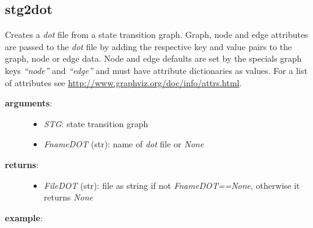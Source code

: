 \documentclass[letterpaper,10pt,english]{sphinxmanual}
\begin{document}
\subsection{stg2dot}
\label{StateTransitionGraphs:stg2dot}\label{StateTransitionGraphs:id18}

\begin{fulllineitems}
\label{StateTransitionGraphs:PyBoolNet.StateTransitionGraphs.stg2dot}
Creates a \emph{dot} file from a state transition graph.
Graph, node and edge attributes are passed to the \emph{dot} file by adding the respective key and value pairs to the graph, node or edge data.
Node and edge defaults are set by the specials graph keys \emph{``node''} and \emph{``edge''} and must have attribute dictionaries as values.
For a list of attributes see \href{http://www.graphviz.org/doc/info/attrs.html}{http://www.graphviz.org/doc/info/attrs.html}.
\begin{description}
\item[{\textbf{arguments}:}] \leavevmode\begin{itemize}
\item {} 
\emph{STG}: state transition graph

\item {} 
\emph{FnameDOT} (str): name of \emph{dot} file or \emph{None}

\end{itemize}

\item[{\textbf{returns}:}] \leavevmode\begin{itemize}
\item {} 
\emph{FileDOT} (str): file as string if not \emph{FnameDOT==None}, otherwise it returns \emph{None}

\end{itemize}

\end{description}

\textbf{example}:


\end{fulllineitems}
\end{document}
